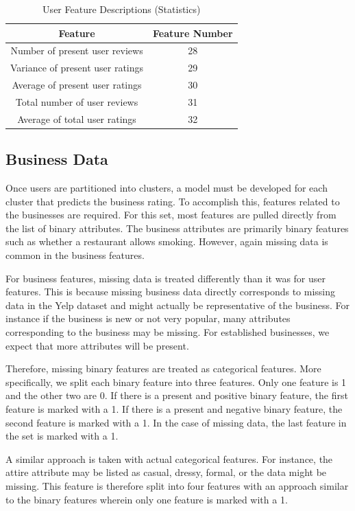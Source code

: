 \documentclass[11pt]{article}
\begin{document}
\begin{table}[h!]
	\caption{User Feature Descriptions (Statistics)}
	\centering
	\begin{tabular}{c|c}
		Feature & Feature Number \\ \hline
		Number of present user reviews & 28 \\
		Variance of present user ratings & 29 \\
		Average of present user ratings & 30 \\
		Total number of user reviews & 31 \\
		Average of total user ratings & 32 \\
	\end{tabular}
	\label{tab:user_features3}
\end{table}

\subsection{Business Data}

Once users are partitioned into clusters, a model must be developed for each cluster that predicts the business rating. To accomplish this, features related to the businesses are required. For this set, most features are pulled directly from the list of binary attributes. The business attributes are primarily binary features such as whether a restaurant allows smoking. However, again missing data is common in the business features.

For business features, missing data is treated differently than it was for user features. This is because missing business data directly corresponds to missing data in the Yelp dataset and might actually be representative of the business. For instance if the business is new or not very popular, many attributes corresponding to the business may be missing. For established businesses, we expect that more attributes will be present. 

Therefore, missing binary features are treated as categorical features. More specifically, we split each binary feature into three features. Only one feature is 1 and the other two are 0. If there is a present and positive binary feature, the first feature is marked with a 1. If there is a present and negative binary feature, the second feature is marked with a 1. In the case of missing data, the last feature in the set is marked with a 1. 

A similar approach is taken with actual categorical features. For instance, the attire attribute may be listed as casual, dressy, formal, or the data might be missing. This feature is therefore split into four features with an approach similar to the binary features wherein only one feature is marked with a 1.
\end{document}
